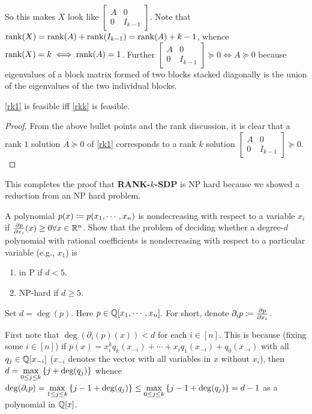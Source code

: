So this makes $X$ look like $\begin{bmatrix}A&0\\0&I_{k-1}\end{bmatrix}$. Note that $\operatorname{rank}(X) = \operatorname{rank}(A) + \operatorname{rank}(I_{k-1}) = \operatorname{rank}(A) + k-1$, whence $\operatorname{rank}(X) = k\iff \operatorname{rank}(A)=1$. Further $\begin{bmatrix}A&0\\0&I_{k-1}\end{bmatrix}\succeq0\iff A\succeq 0$ because eigenvalues of a block matrix formed of two blocks stacked diagonally is the union of the eigenvalues of the two individual blocks.

\begin{cl}
\ref{rk1} is feasible iff \ref{rkk} is feasible.
\end{cl}
\begin{proof}
From the above bullet points and the rank discussion, it is clear that a rank $1$ solution $A \succeq 0$ of \ref{rk1} corresponds to a rank $k$ solution $\begin{bmatrix}A&0\\0&I_{k-1}\end{bmatrix}\succeq 0.$
\end{proof}

This completes the proof that \textbf{RANK-$k$-SDP} is NP hard because we showed a reduction from an NP hard problem.


\newpage

\pb

A polynomial $p(x)\coloneqq p(x_{1},\cdots,x_{n})$ is nondecreasing with respect to a variable $x_{i}$ if $\frac{\partial p}{\partial x_{i}}(x)\ge 0\forall x\in\mathbb{R}^{n}$. Show that the problem of deciding whether a degree-$d$ polynomial with rational coefficients is nondecreasing with respect to a particular variable (e.g., $x_{1}$) is
\begin{enumerate}[label=(\roman*)]
\item in P if $d<5$.
\item NP-hard if $d\ge 5$.
\end{enumerate}

\soln

Set $d=\deg(p)$. Here $p\in\mathbb{Q}[x_{1},\cdots,x_{n}]$. For short, denote $\partial_{i}p \coloneqq \frac{\partial p}{\partial x_{i}}$. 

First note that $\deg(\partial_{i}(p)(x)) < d$ for each $i\in[n]$. This is because (fixing some $i\in[n]$) if $p(x) = x_{i}^{k}q_{k}(x_{-i}) + \cdots + x_{i} q_{1}(x_{-i}) + q_{0}(x_{-i})$ with all $q_{j}\in \mathbb{Q}[x_{-i}]$ ($x_{-i}$ denotes the vector with all variables in $x$ without $x_{i}$), then $d = \max\limits_{0\le j\le k}\left\{j+\deg(q_{j})\right\}$ whence $\deg (\partial_{i}p) = \max\limits_{1\le j\le k}\left\{j-1+\deg(q_{j})\right\} \le \max\limits_{0\le j\le k}\left\{j-1+\deg(q_{j})\right\} = d-1$ as a polynomial in $\mathbb{Q}[x]$.

